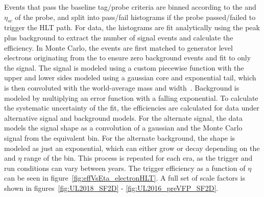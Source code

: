 Events that pass the baseline tag/probe criteria are binned according to the \pt and $\eta_{sc}$ of the probe, and split into pass/fail histograms if the probe passed/failed to trigger the HLT path. For data, the histograms are fit analytically using the \VZ peak plus background to extract the number of signal events and calculate the efficiency. In Monte Carlo, the events are first matched to generator level electrons originating from the \VZ to ensure zero background events and fit to only the \VZ signal. The signal is modeled using a custom piecewise function with the upper and lower sides modeled using a gaussian core and exponential tail, which is then convoluted with the world-average \VZ mass and width~\cite{Sirunyan_2021}. Background is modeled by multiplying an error function with a falling exponential. To calculate the systematic uncertainty of the fit, the efficiencies are calculated for data under alternative signal and background models. For the alternate signal, the data models the signal shape as a convolution of a gaussian and the Monte Carlo signal from the equivalent bin. For the alternate background, the shape is modeled as just an exponential, which can either grow or decay depending on the \pt and $\eta$ range of the bin. This process is repeated for each era, as the trigger and run conditions can vary between years. The trigger efficiency as a function of $\eta$ can be seen in figure~\ref{fig:effVsEta_electronHLT}. A full set of scale factors is shown in figures~\ref{fig:UL2018_SF2D} - \ref{fig:UL2016_preVFP_SF2D}.

